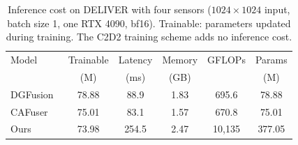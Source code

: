 \begin{table}[tb]
\caption{Inference cost on DELIVER with four sensors ($1024\times1024$ input, batch size 1, one RTX 4090, bf16). Trainable: parameters updated during training. The C2D2 training scheme adds no inference cost.}
\label{tab:cost}
\centering\tabsetup
\begin{tabular*}{\columnwidth}{@{\extracolsep{\fill}}lccccc@{}}
\toprule
Model & Trainable & Latency & Memory & GFLOPs & Params \\
 & (M) & (ms) & (GB) & & (M) \\
\midrule
DGFusion~\cite{dgfusion2026} & 78.88 & 88.9 & 1.83 & 695.6 & 78.88 \\
CAFuser~\cite{cafuser2025} & 75.01 & 83.1 & 1.57 & 670.8 & 75.01 \\
Ours & 73.98 & 254.5 & 2.47 & 10{,}135 & 377.05 \\
\bottomrule
\end{tabular*}
\end{table}

